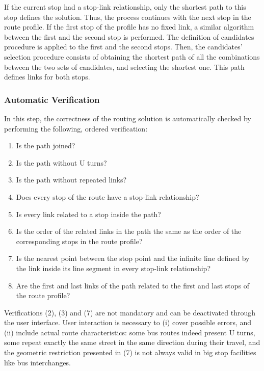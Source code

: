 If the current stop had a stop-link relationship, only the shortest path to this stop defines the solution. Thus, the process continues with the next stop in the route profile. If the first stop of the profile has no fixed link, a similar algorithm between the first and the second stop is performed. The definition of candidates procedure is applied to the first and the second stops. Then, the candidates' selection procedure consists of obtaining the shortest path of all the combinations between the two sets of candidates, and selecting the shortest one. This path defines links for both stops.

\subsubsection{Automatic Verification}
In this step, the correctness of the routing solution is automatically checked by performing the following, ordered verification:
%
\begin{enumerate}\styleEnumerate
\item Is the path joined?
\item Is the path without U turns?
\item Is the path without repeated links?
\item Does every stop of the route have a stop-link relationship?
\item Is every link related to a stop inside the path?
\item Is the order of the related links in the path the same as the order of the corresponding stops in the route profile?
\item Is the nearest point between the stop point and the infinite line defined by the link inside its line segment in every stop-link relationship?
\item Are the first and last links of the path related to the first and last  stops of the route profile?
\end{enumerate}

Verifications (2), (3) and (7) are not mandatory and can be deactivated through the user interface. User interaction is necessary to (i) cover possible errors, and (ii) include actual route characteristics: some bus routes indeed present U turns, some repeat exactly the same street in the same direction during their travel, and the geometric restriction presented in (7) is not always valid in big stop facilities like bus interchanges.

